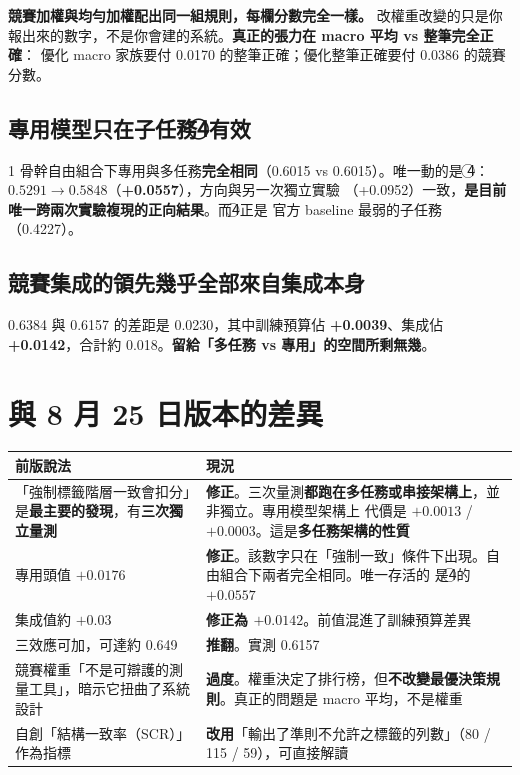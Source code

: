 \documentclass[11pt,a4paper]{ctexart}
\begin{document}
\textbf{競賽加權與均勻加權配出同一組規則，每欄分數完全一樣。} 改權重改變的只是你
報出來的數字，不是你會建的系統。\textbf{真正的張力在 macro 平均 vs 整筆完全正確}：
優化 macro 家族要付 0.0170 的整筆正確；優化整筆正確要付 0.0386 的競賽分數。

\subsection{專用模型只在子任務\textcircled{4}有效}

1 骨幹自由組合下專用與多任務\textbf{完全相同}（0.6015 vs 0.6015）。唯一動的是
\textcircled{4}：$0.5291 \to 0.5848$（\textbf{+0.0557}），方向與另一次獨立實驗
（+0.0952）一致，\textbf{是目前唯一跨兩次實驗複現的正向結果}。而\textcircled{4}正是
官方 baseline 最弱的子任務（0.4227）。

\subsection{競賽集成的領先幾乎全部來自集成本身}

0.6384 與 0.6157 的差距是 0.0230，其中訓練預算佔 \textbf{+0.0039}、集成佔
\textbf{+0.0142}，合計約 0.018。\textbf{留給「多任務 vs 專用」的空間所剩無幾}。

\section{與 8 月 25 日版本的差異}
\label{sec:diff}

\begin{longtable}{@{}p{6.4cm}p{8.2cm}@{}}
\toprule
前版說法 & 現況 \\
\midrule
\endhead
「強制標籤階層一致會扣分」是\textbf{最主要的發現}，有\textbf{三次獨立量測} &
\textbf{修正}。三次量測\textbf{都跑在多任務或串接架構上}，並非獨立。專用模型架構上
代價是 $+0.0013$ / $+0.0003$。這是\textbf{多任務架構的性質} \\
\addlinespace
專用頭值 $+0.0176$ &
\textbf{修正}。該數字只在「強制一致」條件下出現。自由組合下兩者完全相同。唯一存活的
是\textcircled{4}的 $+0.0557$ \\
\addlinespace
集成值約 $+0.03$ & \textbf{修正為 $+0.0142$}。前值混進了訓練預算差異 \\
\addlinespace
三效應可加，可達約 0.649 & \textbf{推翻}。實測 0.6157 \\
\addlinespace
競賽權重「不是可辯護的測量工具」，暗示它扭曲了系統設計 &
\textbf{過度}。權重決定了排行榜，但\textbf{不改變最優決策規則}。真正的問題是 macro
平均，不是權重 \\
\addlinespace
自創「結構一致率（SCR）」作為指標 &
\textbf{改用}「輸出了準則不允許之標籤的列數」（80 / 115 / 59），可直接解讀 \\
\bottomrule
\end{longtable}
\end{document}
